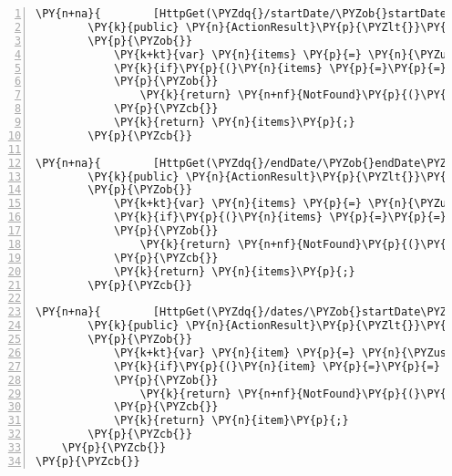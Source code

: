 \begin{Verbatim}[commandchars=\\\{\},numbers=left,firstnumber=1,stepnumber=1,numberblanklines=0]
\PY{n+na}{        [HttpGet(\PYZdq{}/startDate/\PYZob{}startDate\PYZcb{}\PYZdq{})]}
        \PY{k}{public} \PY{n}{ActionResult}\PY{p}{\PYZlt{}}\PY{n}{List}\PY{p}{\PYZlt{}}\PY{n}{Stat}\PY{p}{\PYZgt{}}\PY{p}{\PYZgt{}} \PY{n}{GetByStartDate}\PY{p}{(}\PY{n}{DateTime} \PY{n}{startDate}\PY{p}{)}
        \PY{p}{\PYZob{}}
            \PY{k+kt}{var} \PY{n}{items} \PY{p}{=} \PY{n}{\PYZus{}context}\PY{p}{.}\PY{n}{Stats}\PY{p}{.}\PY{n}{Where}\PY{p}{(}\PY{n}{s} \PY{p}{=}\PY{p}{\PYZgt{}} \PY{n}{s}\PY{p}{.}\PY{n}{startDate}\PY{p}{.}\PY{n}{Equals}\PY{p}{(}\PY{n}{startDate}\PY{p}{)}\PY{p}{)}\PY{p}{.}\PY{n}{ToList}\PY{p}{(}\PY{p}{)}\PY{p}{;}
            \PY{k}{if}\PY{p}{(}\PY{n}{items} \PY{p}{=}\PY{p}{=} \PY{k}{null}\PY{p}{)}
            \PY{p}{\PYZob{}}
                \PY{k}{return} \PY{n+nf}{NotFound}\PY{p}{(}\PY{p}{)}\PY{p}{;}
            \PY{p}{\PYZcb{}}
            \PY{k}{return} \PY{n}{items}\PY{p}{;}
        \PY{p}{\PYZcb{}}

\PY{n+na}{        [HttpGet(\PYZdq{}/endDate/\PYZob{}endDate\PYZcb{}\PYZdq{})]}
        \PY{k}{public} \PY{n}{ActionResult}\PY{p}{\PYZlt{}}\PY{n}{List}\PY{p}{\PYZlt{}}\PY{n}{Stat}\PY{p}{\PYZgt{}}\PY{p}{\PYZgt{}} \PY{n}{GetByEndDate}\PY{p}{(}\PY{n}{DateTime} \PY{n}{endDate}\PY{p}{)}
        \PY{p}{\PYZob{}}
            \PY{k+kt}{var} \PY{n}{items} \PY{p}{=} \PY{n}{\PYZus{}context}\PY{p}{.}\PY{n}{Stats}\PY{p}{.}\PY{n}{Where}\PY{p}{(}\PY{n}{s} \PY{p}{=}\PY{p}{\PYZgt{}} \PY{n}{s}\PY{p}{.}\PY{n}{endDate}\PY{p}{.}\PY{n}{Equals}\PY{p}{(}\PY{n}{endDate}\PY{p}{)}\PY{p}{)}\PY{p}{.}\PY{n}{ToList}\PY{p}{(}\PY{p}{)}\PY{p}{;}
            \PY{k}{if}\PY{p}{(}\PY{n}{items} \PY{p}{=}\PY{p}{=} \PY{k}{null}\PY{p}{)}
            \PY{p}{\PYZob{}}
                \PY{k}{return} \PY{n+nf}{NotFound}\PY{p}{(}\PY{p}{)}\PY{p}{;}
            \PY{p}{\PYZcb{}}
            \PY{k}{return} \PY{n}{items}\PY{p}{;}
        \PY{p}{\PYZcb{}}

\PY{n+na}{        [HttpGet(\PYZdq{}/dates/\PYZob{}startDate\PYZcb{}/\PYZob{}endDate\PYZcb{}\PYZdq{})]}
        \PY{k}{public} \PY{n}{ActionResult}\PY{p}{\PYZlt{}}\PY{n}{Stat}\PY{p}{\PYZgt{}} \PY{n}{GetByDates}\PY{p}{(}\PY{n}{DateTime} \PY{n}{startDate}\PY{p}{,} \PY{n}{DateTime} \PY{n}{endDate}\PY{p}{)}
        \PY{p}{\PYZob{}}
            \PY{k+kt}{var} \PY{n}{item} \PY{p}{=} \PY{n}{\PYZus{}context}\PY{p}{.}\PY{n}{Stats}\PY{p}{.}\PY{n}{Where}\PY{p}{(}\PY{n}{s} \PY{p}{=}\PY{p}{\PYZgt{}} \PY{n}{s}\PY{p}{.}\PY{n}{startDate}\PY{p}{.}\PY{n}{Equals}\PY{p}{(}\PY{n}{startDate}\PY{p}{)} \PY{p}{\PYZam{}}\PY{p}{\PYZam{}} \PY{n}{s}\PY{p}{.}\PY{n}{endDate}\PY{p}{.}\PY{n}{Equals}\PY{p}{(}\PY{n}{endDate}\PY{p}{)}\PY{p}{)}\PY{p}{.}\PY{n}{First}\PY{p}{(}\PY{p}{)}\PY{p}{;}
            \PY{k}{if}\PY{p}{(}\PY{n}{item} \PY{p}{=}\PY{p}{=} \PY{k}{null}\PY{p}{)}
            \PY{p}{\PYZob{}}
                \PY{k}{return} \PY{n+nf}{NotFound}\PY{p}{(}\PY{p}{)}\PY{p}{;}
            \PY{p}{\PYZcb{}}
            \PY{k}{return} \PY{n}{item}\PY{p}{;}
        \PY{p}{\PYZcb{}}
    \PY{p}{\PYZcb{}}
\PY{p}{\PYZcb{}}
\end{Verbatim}
